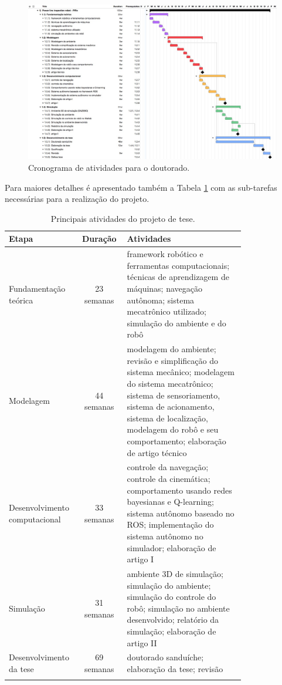 \begin{figure} [h!]												%
	\centering													%
	\includegraphics[width=1.1\textwidth]{./PIRo}				%
	\caption{Cronograma de atividades para o doutorado.}			%
	\label{piro}												%
\end{figure}													%

\noindent Para maiores detalhes é apresentado também a Tabela \ref{table:tasks1} com as sub-tarefas necessárias para a realização do projeto.

\begin{table} [ht!]
\caption{Principais atividades do projeto de tese.}
\centering
\begin{tabular}{p{0.3\linewidth}cp{0.5\linewidth}}
\hline\hline
Etapa & Duração & Atividades \\ [0.5ex] %
\hline
Fundamentação teórica & 23 semanas & framework robótico e ferramentas computacionais; técnicas de aprendizagem de máquinas; navegação autônoma; sistema mecatrônico utilizado; simulação do ambiente e do robô\\
\hline
Modelagem & 44 semanas & modelagem do ambiente; revisão e simplificação do sistema mecânico; modelagem do sistema mecatrônico; sistema de sensoriamento, sistema de acionamento, sistema de localização, modelagem do robô e seu comportamento; elaboração de artigo técnico\\[1ex]
\hline
Desenvolvimento computacional & 33 semanas & controle da navegação; controle da cinemática; comportamento usando redes bayesianas e Q-learning; sistema autônomo baseado no ROS; implementação do sistema autônomo no simulador; elaboração de artigo I\\[1ex]
\hline
Simulação & 31 semanas & ambiente 3D de simulação; simulação do ambiente; simulação do controle do robô; simulação no ambiente desenvolvido; relatório da simulação; elaboração de artigo II\\[1ex]
\hline
Desenvolvimento da tese & 69 semanas & doutorado sanduíche; elaboração da tese; revisão\\[1ex]
\hline
\\
\end{tabular}
\label{table:tasks1}
\end{table}

